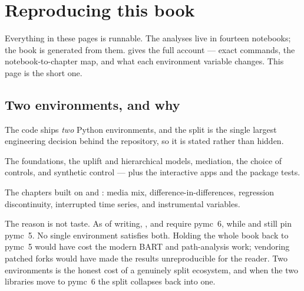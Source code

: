 \chapter*{Reproducing this book}

Everything in these pages is runnable. The analyses live in fourteen notebooks; the book is
generated from them.  gives the full account --- exact commands, the notebook-to-chapter
map, and what each environment variable changes. This page is the short one.

\section*{Two environments, and why}

The code ships \emph{two} Python environments, and the split is the single largest engineering
decision behind the repository, so it is stated rather than hidden.

\begin{description}[leftmargin=1.2em, style=nextline, font=\normalfont\bfseries]
  \item[\code{cmp-core} --- pymc $\ge$ 6.] The foundations, the uplift and hierarchical models,
  mediation, the choice of controls, and synthetic control --- plus the interactive apps and the
  package tests.
  \item[\code{cmp-legacy} --- pymc $<$ 6.] The chapters built on  and
  : media mix, difference-in-differences, regression discontinuity,
  interrupted time series, and instrumental variables.
\end{description}

The reason is not taste. As of writing, ,  and  require
pymc~6, while  and  still pin pymc~5. No single environment
satisfies both. Holding the whole book back to pymc~5 would have cost the modern BART and
path-analysis work; vendoring patched forks would have made the results unreproducible for the
reader. Two environments is the honest cost of a genuinely split ecosystem, and when the two
libraries move to pymc~6 the split collapses back into one.

